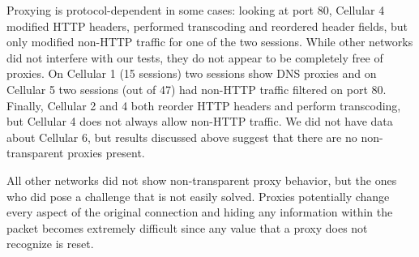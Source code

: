 \documentclass{sig-alternate-10pt}
\begin{document}
Proxying is protocol-dependent in some cases: looking at port 80, Cellular 4\*\* modified HTTP headers, performed transcoding and reordered header fields, but only modified non-HTTP traffic for one of the two sessions. While other networks did not interfere with our tests, they do not appear to be completely free of proxies. On Cellular 1 (15 sessions) two sessions show DNS proxies and on Cellular 5 two sessions (out of 47) had non-HTTP traffic filtered on port 80. Finally, Cellular 2 and 4 both reorder HTTP headers and perform transcoding, but Cellular 4 does not always allow non-HTTP traffic. We did not have data about Cellular 6, but results discussed above suggest that there are no non-transparent proxies present.

All other networks did not show non-transparent proxy behavior, but the ones who did pose a challenge that is not easily solved. Proxies potentially change every aspect of the original connection and hiding any information within the packet becomes extremely difficult since any value that a proxy does not recognize is reset.
\end{document}

